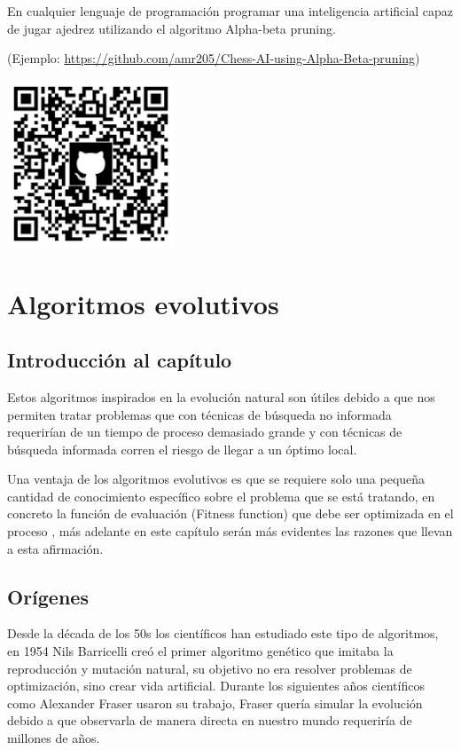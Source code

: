 \documentclass[11pt,fleqn]{book} %
\begin{document}
En cualquier lenguaje de programación programar una inteligencia artificial capaz de jugar ajedrez utilizando el algoritmo Alpha-beta pruning.


(Ejemplo: \url{https://github.com/amr205/Chess-AI-using-Alpha-Beta-pruning})


\includegraphics[width=5cm]{Pictures/github/alphabeta.png}


\chapter{Algoritmos evolutivos}

\section{Introducción al capítulo}

Estos algoritmos inspirados en la evolución natural son útiles debido a que nos permiten tratar problemas que con técnicas de búsqueda no informada requerirían de un tiempo de proceso demasiado grande y con técnicas de búsqueda informada corren el riesgo de llegar a un óptimo local.

Una ventaja de los algoritmos evolutivos es que se requiere solo una pequeña cantidad de conocimiento específico sobre el problema que se está tratando, en concreto la función de evaluación (Fitness function) que debe ser optimizada en el proceso \cite{streichert2002introduction}, más adelante en este capítulo serán más evidentes las razones que llevan a esta afirmación.

\section{Orígenes} 

Desde la década de los 50s los científicos han estudiado este tipo de algoritmos, en 1954 Nils Barricelli creó el primer algoritmo genético que imitaba la reproducción y mutación natural, su objetivo no era resolver problemas de optimización, sino crear vida artificial. Durante los siguientes años científicos como Alexander Fraser usaron su trabajo, Fraser quería simular la evolución debido a que observarla de manera directa en nuestro mundo requeriría de millones de años.
\end{document}
